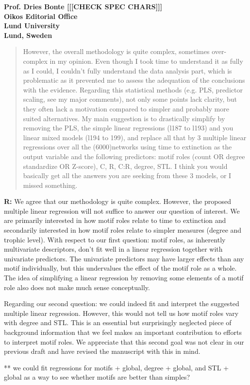 \documentclass[12pt]{letter}
\begin{document}
\begin{letter}{\bf Prof. Dries Bonte [[[CHECK SPEC CHARS]]]\\
Oikos Editorial Office \\
Lund University \\
Lund, Sweden}
  \begin{quotation}
  However, the overall methodology is quite complex, sometimes over-complex in my opinion. Even though I took time to understand it as fully as I could, I couldn’t fully understand the data analysis part, which is problematic as it prevented me to assess the adequation of the conclusions with the evidence. Regarding this statistical methods (e.g. PLS, predictor scaling, see my major comments), not only some points lack clarity, but they often lack a motivation compared to simpler and probably more suited alternatives. My main suggestion is to drastically simplify by removing the PLS, the simple linear regressions (l187 to l193) and you linear mixed models (l194 to 199), and replace all that by 3 multiple linear regressions over all the (6000)networks using time to extinction as the output variable and the following predictors: motif roles (count OR degree standardize OR Z-score), C, R, C:R, degree, STL. I think you would basically get all the answers you are seeking from these 3 models, or I missed something.
  \end{quotation}


  \textbf{R:} We agree that our methodology is quite complex. However, the proposed multiple linear regression will not suffice to answer our question of interest. We are primarily interested in how motif roles relate to time to extinction and secondarily interested in how motif roles relate to simpler measures (degree and trophic level). With respect to our first question: motif roles, as inherently multivariate descriptors, don't fit well in a linear regression together with univariate predictors. The univariate predictors may have larger effects than any motif individually, but this undervalues the effect of the motif role as a whole. The idea of simplifying a linear regression by removing some elements of a motif role also does not make much sense conceptually.

  Regarding our second question: we could indeed fit and interpret the suggested multiple linear regression. However, this would not tell us how motif roles vary with degree and STL. This is an essential but surprisingly neglected piece of background information that we feel makes an important contribution to efforts to interpret motif roles.
  We appreciate that this second goal was not clear in our previous draft and have revised the manuscript with this in mind.

  ** we could fit regressions for motifs + global, degree + global, and STL + global as a way to see whether motifs are better than simples?


\end{letter}
\end{document}
